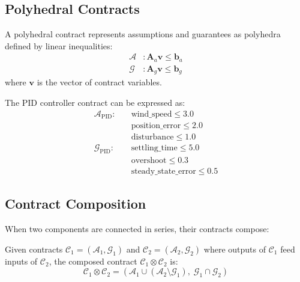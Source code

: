 \subsection{Polyhedral Contracts}

\begin{definition}
A polyhedral contract represents assumptions and guarantees as polyhedra defined by linear inequalities:
\begin{align}
    \mathcal{A} &: \mathbf{A}_a \mathbf{v} \leq \mathbf{b}_a \\
    \mathcal{G} &: \mathbf{A}_g \mathbf{v} \leq \mathbf{b}_g
\end{align}
where $\mathbf{v}$ is the vector of contract variables.
\end{definition}

\begin{example}
The PID controller contract can be expressed as:
\begin{align}
    \mathcal{A}_{\text{PID}}: \quad & \text{wind\_speed} \leq 3.0 \\
    & \text{position\_error} \leq 2.0 \\
    & \text{disturbance} \leq 1.0 \\[6pt]
    \mathcal{G}_{\text{PID}}: \quad & \text{settling\_time} \leq 5.0 \\
    & \text{overshoot} \leq 0.3 \\
    & \text{steady\_state\_error} \leq 0.5
\end{align}
\end{example}

\subsection{Contract Composition}

When two components are connected in series, their contracts compose:

\begin{theorem}
\label{thm:composition}
Given contracts $\mathcal{C}_1 = (\mathcal{A}_1, \mathcal{G}_1)$ and $\mathcal{C}_2 = (\mathcal{A}_2, \mathcal{G}_2)$ where outputs of $\mathcal{C}_1$ feed inputs of $\mathcal{C}_2$, the composed contract $\mathcal{C}_1 \otimes \mathcal{C}_2$ is:
\begin{equation}
\mathcal{C}_1 \otimes \mathcal{C}_2 = \left( \mathcal{A}_1 \cup (\mathcal{A}_2 \setminus \mathcal{G}_1), \; \mathcal{G}_1 \cap \mathcal{G}_2 \right)
\label{eq:composition}
\end{equation}
\end{theorem}

